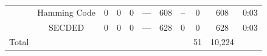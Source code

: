\begin{table}[t]
\begin{tabular}{@{}ccccccccccc@{}}
                                                                                   & Hamming Code  & 0     & 0      & 0     & —         & 608                                                               & --                                                               & 0           & 608    & 0:03                                                     \\
                                                                                   & SECDED        & 0     & 0      & 0     & —         & 628                                                               & 0                                                                & 0           & 628    & 0:03                                                     \\\midrule
        Total                                                                      &               &       &        &       &           &                                                                   &                                                                  & 51          & 10,224 &                                                          \\
        \bottomrule
    \end{tabular}
\end{table}


